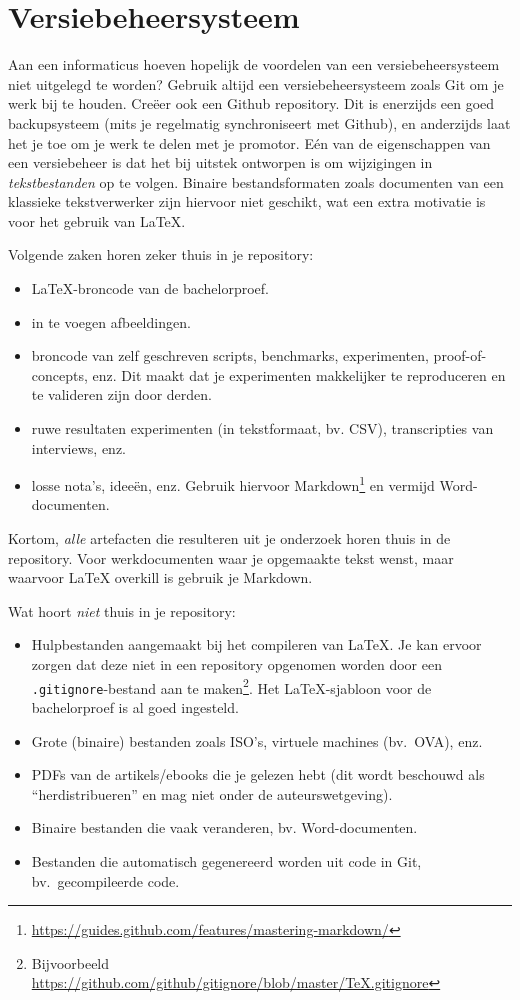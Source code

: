 \section{Versiebeheersysteem}%
\label{sec:versiebeheersysteem}

Aan een informaticus hoeven hopelijk de voordelen van een versiebeheersysteem niet uitgelegd te worden? Gebruik altijd een versiebeheersysteem zoals Git om je werk bij te houden. Creëer ook een Github repository. Dit is enerzijds een goed backupsysteem (mits je regelmatig synchroniseert met Github), en anderzijds laat het je toe om je werk te delen met je promotor. Eén van de eigenschappen van een versiebeheer is dat het bij uitstek ontworpen is om wijzigingen in \emph{tekstbestanden} op te volgen. Binaire bestandsformaten zoals documenten van een klassieke tekstverwerker zijn hiervoor niet geschikt, wat een extra motivatie is voor het gebruik van \LaTeX{}.

Volgende zaken horen zeker thuis in je repository:

\begin{itemize}
  \item \LaTeX{}-broncode van de bachelorproef.
  \item in te voegen afbeeldingen.
  \item broncode van zelf geschreven scripts, benchmarks, experimenten, proof-of-concepts, enz. Dit maakt dat je experimenten makkelijker te reproduceren en te valideren zijn door derden.
  \item ruwe resultaten experimenten (in tekstformaat, bv. CSV), transcripties van interviews, enz.
  \item losse nota's, ideeën, enz. Gebruik hiervoor Markdown\footnote{\url{https://guides.github.com/features/mastering-markdown/}} en vermijd Word-do\-cu\-men\-ten.
\end{itemize}

Kortom, \emph{alle} artefacten die resulteren uit je onderzoek horen thuis in de repository. Voor werkdocumenten waar je opgemaakte tekst wenst, maar waarvoor \LaTeX{} overkill is gebruik je Markdown.

Wat hoort \emph{niet} thuis in je repository:

\begin{itemize}
  \item Hulpbestanden aangemaakt bij het compileren van \LaTeX{}. Je kan ervoor zorgen dat deze niet in een repository opgenomen worden door een \texttt{.gitignore}-bestand aan te maken\footnote{Bijvoorbeeld \url{https://github.com/github/gitignore/blob/master/TeX.gitignore}}. Het \LaTeX{}-sjabloon voor de bachelorproef is al goed ingesteld.
  \item Grote (binaire) bestanden zoals ISO's, virtuele machines (bv.\ OVA), enz.
  \item PDFs van de artikels/ebooks die je gelezen hebt (dit wordt beschouwd als ``herdistribueren'' en mag niet onder de auteurswetgeving).
  \item Binaire bestanden die vaak veranderen, bv. Word-documenten.
  \item Bestanden die automatisch gegenereerd worden uit code in Git, bv.\ gecompileerde code.
\end{itemize}


